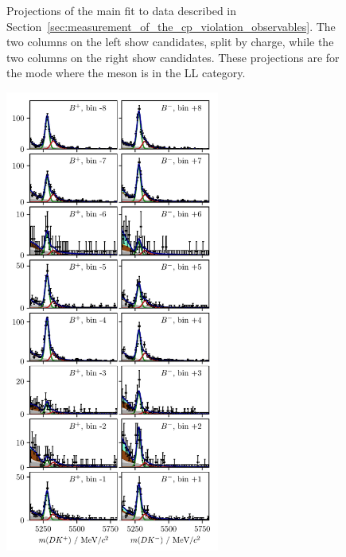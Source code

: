 \begin{figure}[tp]
    \caption{Projections of the main fit to data described in Section~\ref{sec:measurement_of_the_cp_violation_observables}. The two columns on the left show \BtoDK candidates, split by charge, while the two columns on the right show \BtoDpi candidates. These projections are for the \DtoKspp mode where the \KS meson is in the LL category.}
    \label{fig:all_proj_LL_2}
\end{figure}

\begin{figure}[tp]
    \centering
    \includegraphics[height=6in]{figures/analysis/bin_by_bin/pretty_fit_bins_dk_DD_1.pdf}

\end{figure}
